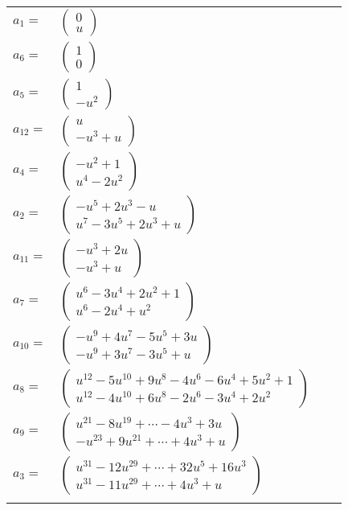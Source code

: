 \documentclass[1p]{elsarticle_modified}
\theoremstyle{definition}
\begin{document}
\begin{tabular}{m{7pt} m{180pt} m{7pt} m{180pt} }
\flushright $a_{1}=$&$\begin{pmatrix}0\\u\end{pmatrix}$ \\
\flushright $a_{6}=$&$\begin{pmatrix}1\\0\end{pmatrix}$ \\
\flushright $a_{5}=$&$\begin{pmatrix}1\\- u^2\end{pmatrix}$ \\
\flushright $a_{12}=$&$\begin{pmatrix}u\\- u^3+u\end{pmatrix}$ \\
\flushright $a_{4}=$&$\begin{pmatrix}- u^2+1\\u^4-2 u^2\end{pmatrix}$ \\
\flushright $a_{2}=$&$\begin{pmatrix}- u^5+2 u^3- u\\u^7-3 u^5+2 u^3+u\end{pmatrix}$ \\
\flushright $a_{11}=$&$\begin{pmatrix}- u^3+2 u\\- u^3+u\end{pmatrix}$ \\
\flushright $a_{7}=$&$\begin{pmatrix}u^6-3 u^4+2 u^2+1\\u^6-2 u^4+u^2\end{pmatrix}$ \\
\flushright $a_{10}=$&$\begin{pmatrix}- u^9+4 u^7-5 u^5+3 u\\- u^9+3 u^7-3 u^5+u\end{pmatrix}$ \\
\flushright $a_{8}=$&$\begin{pmatrix}u^{12}-5 u^{10}+9 u^8-4 u^6-6 u^4+5 u^2+1\\u^{12}-4 u^{10}+6 u^8-2 u^6-3 u^4+2 u^2\end{pmatrix}$ \\
\flushright $a_{9}=$&$\begin{pmatrix}u^{21}-8 u^{19}+\cdots-4 u^3+3 u\\- u^{23}+9 u^{21}+\cdots+4 u^3+u\end{pmatrix}$ \\
\flushright $a_{3}=$&$\begin{pmatrix}u^{31}-12 u^{29}+\cdots+32 u^5+16 u^3\\u^{31}-11 u^{29}+\cdots+4 u^3+u\end{pmatrix}$\\&\end{tabular}
\end{document}
